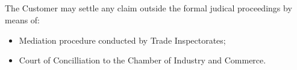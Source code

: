 \subsection{} The Customer may settle any claim outside the formal judical proceedings by means of:
				\begin{itemize}
					\item  Mediation procedure conducted by Trade Inspectorates;
					\item  Court of Concilliation to the Chamber of Industry and Commerce. 
				\end{itemize} 

